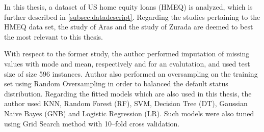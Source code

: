 In this thesis, a dataset of US home equity loans (HMEQ) is analyzed, which is further described in \autoref{subsec:datadescript}.
Regarding the studies pertaining to the HMEQ data set, the study of Aras \citep{serkan2021bagging} and the study of Zurada \citep{zuradaresults} are deemed to best the most relevant to this thesis.


With respect to the former study, the author performed imputation of missing values with mode and mean, respectively and for an evalutation, and used test size of size 596 instances.
Author also performed an oversampling on the training set using Random Oversampling in order to balanced the default status distribution.
Regarding the fitted models which are also used in this thesis, the author used KNN, Random Forest (RF), SVM, Decision Tree (DT), Gaussian Naive Bayes (GNB) and Logistic Regression (LR).
Such models were also tuned using Grid Search method with 10--fold cross validation.

